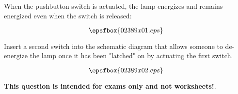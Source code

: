 

When the pushbutton switch is actuated, the lamp energizes and remains energized even when the switch is released:

$$\epsfbox{02389x01.eps}$$

Insert a second switch into the schematic diagram that allows someone to de-energize the lamp once it has been "latched" on by actuating the first switch.







$$\epsfbox{02389x02.eps}$$







{\bf This question is intended for exams only and not worksheets!}.




